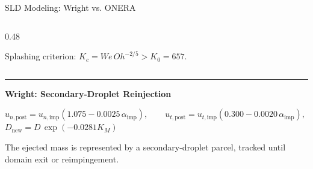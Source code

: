 \begin{frame}{SLD Modeling: Wright vs. ONERA}
\begin{columns}[T,onlytextwidth]
\begin{column}{0.48\textwidth}
\vspace{0.05cm}

{\scriptsize
Splashing criterion:
$K_c=We\,Oh^{-2/5}>K_0=657$.
}

\end{column}

\end{columns}

\vspace{0.08cm}

\hrule

\vspace{0.08cm}

{\color{champsBlue}\bfseries
Wright: Secondary-Droplet Reinjection}

\vspace{0.04cm}
{\centering\small
$u_{n,\mathrm{post}}=u_{n,\mathrm{imp}}\left(1.075-0.0025\,\alpha_{\mathrm{imp}}\right),\qquad
u_{t,\mathrm{post}}=u_{t,\mathrm{imp}}\left(0.300-0.0020\,\alpha_{\mathrm{imp}}\right),$\\[0.08cm]
$D_{\mathrm{new}}=D\,\exp(-0.0281K_M)$\par}

\vspace{0.04cm}

{\scriptsize
The ejected mass is represented by a secondary-droplet
parcel, tracked until domain exit or reimpingement.
}

\vfill

\end{frame}



